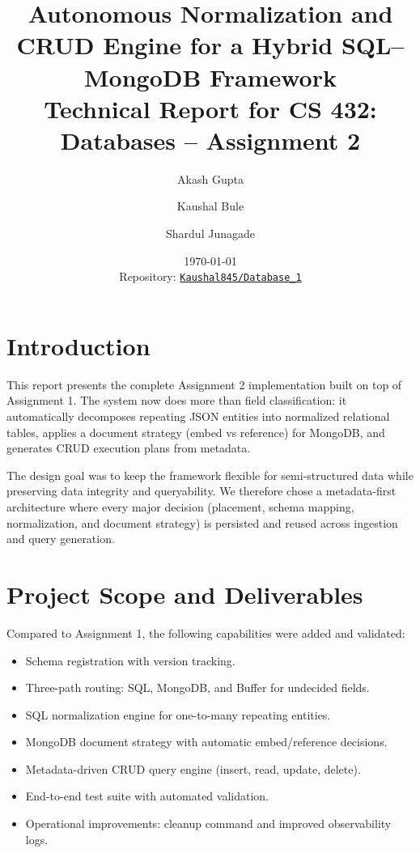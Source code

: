 \documentclass[12pt,a4paper]{article}
\title{\textbf{Autonomous Normalization and CRUD Engine for a Hybrid SQL--MongoDB Framework}\\[0.5em]
\large Technical Report for CS 432: Databases -- Assignment 2}
\author{Akash Gupta \and Kaushal Bule \and Shardul Junagade}
\date{\today\\[0.3em]
\small Repository: \href{https://github.com/Kaushal845/Database_1}{\texttt{Kaushal845/Database\_1}}}
\begin{document}
\maketitle
\onehalfspacing

\section{Introduction}
This report presents the complete Assignment 2 implementation built on top of Assignment 1. The system now does more than field classification: it automatically decomposes repeating JSON entities into normalized relational tables, applies a document strategy (embed vs reference) for MongoDB, and generates CRUD execution plans from metadata.

The design goal was to keep the framework flexible for semi-structured data while preserving data integrity and queryability. We therefore chose a metadata-first architecture where every major decision (placement, schema mapping, normalization, and document strategy) is persisted and reused across ingestion and query generation.

\section{Project Scope and Deliverables}
Compared to Assignment 1, the following capabilities were added and validated:
\begin{itemize}[leftmargin=*]
  \item Schema registration with version tracking.
  \item Three-path routing: SQL, MongoDB, and Buffer for undecided fields.
  \item SQL normalization engine for one-to-many repeating entities.
  \item MongoDB document strategy with automatic embed/reference decisions.
  \item Metadata-driven CRUD query engine (insert, read, update, delete).
  \item End-to-end test suite with automated validation.
  \item Operational improvements: cleanup command and improved observability logs.
\end{itemize}
\end{document}
